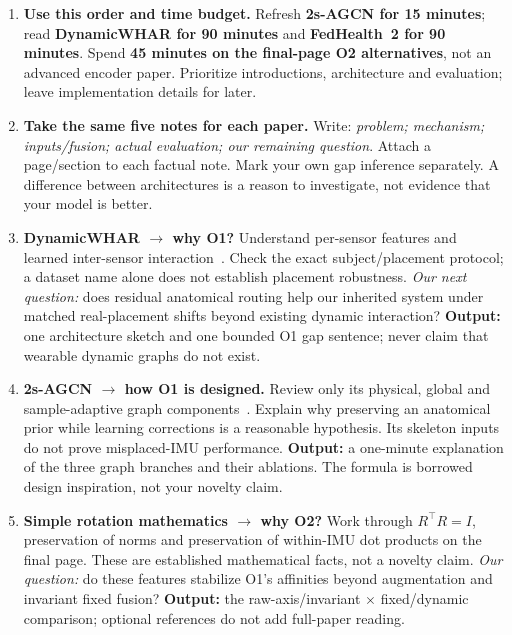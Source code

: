 \documentclass[10pt]{article}
\begin{document}
\begin{enumerate}[label=\textbf{\arabic*.},itemsep=5pt]
\item \textbf{Use this order and time budget.} Refresh \textbf{2s-AGCN for 15 minutes}; read \textbf{DynamicWHAR for 90 minutes} and \textbf{FedHealth~2 for 90 minutes}. Spend \textbf{45 minutes on the final-page O2 alternatives}, not an advanced encoder paper. Prioritize introductions, architecture and evaluation; leave implementation details for later.

\item \textbf{Take the same five notes for each paper.} Write: \emph{problem; mechanism; inputs/fusion; actual evaluation; our remaining question}. Attach a page/section to each factual note. Mark your own gap inference separately. A difference between architectures is a reason to investigate, not evidence that your model is better.

\item \textbf{DynamicWHAR $\rightarrow$ why O1?} Understand per-sensor features and learned inter-sensor interaction~\cite{omdynamic}. Check the exact subject/placement protocol; a dataset name alone does not establish placement robustness. \emph{Our next question:} does residual anatomical routing help our inherited system under matched real-placement shifts beyond existing dynamic interaction? \textbf{Output:} one architecture sketch and one bounded O1 gap sentence; never claim that wearable dynamic graphs do not exist.

\item \textbf{2s-AGCN $\rightarrow$ how O1 is designed.} Review only its physical, global and sample-adaptive graph components~\cite{omagcn}. Explain why preserving an anatomical prior while learning corrections is a reasonable hypothesis. Its skeleton inputs do not prove misplaced-IMU performance. \textbf{Output:} a one-minute explanation of the three graph branches and their ablations. The formula is borrowed design inspiration, not your novelty claim.

\item \textbf{Simple rotation mathematics $\rightarrow$ why O2?} Work through $R^{\top}R=I$, preservation of norms and preservation of within-IMU dot products on the final page. These are established mathematical facts, not a novelty claim. \emph{Our question:} do these features stabilize O1's affinities beyond augmentation and invariant fixed fusion? \textbf{Output:} the raw-axis/invariant $\times$ fixed/dynamic comparison; optional references do not add full-paper reading.


\end{enumerate}
\end{document}
